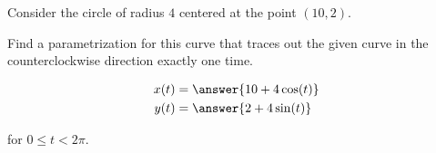 \documentclass{ximera}
\author{Jason Miller}
\begin{document}
\begin{exercise}


Consider the circle of radius $4$ centered at the point $(10, 2)$. 

Find a parametrization for this curve that traces out the given curve in the counterclockwise direction exactly one time.


\begin{align*}
x(t)&=\answer{10+4\cos(t)}\\
y(t)&=\answer{2+4\sin(t)}
\end{align*}

for $0 \leq t < 2\pi $. 


\end{exercise}
\end{document}
